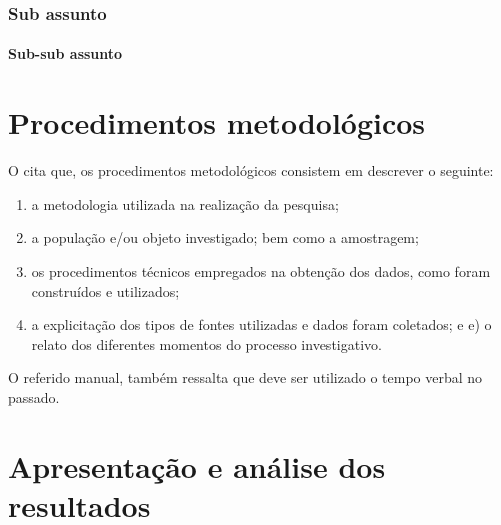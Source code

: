 \lipsum[2-3]

\subsection{Sub assunto}

\lipsum[3-4]

\subsubsection{Sub-sub assunto}

\lipsum[4-5]


\lipsum[5-6]

\chapter{Procedimentos metodológicos}

O  cita que, os procedimentos metodológicos consistem em descrever o seguinte:

\begin{enumerate}[label=\alph*)]
    \item a metodologia utilizada na realização da pesquisa;
    \item a população e/ou objeto investigado; bem como a amostragem;
    \item os procedimentos técnicos empregados na obtenção dos dados, como foram
construídos e utilizados;
    \item a explicitação dos tipos de fontes utilizadas e dados foram coletados; e e) o relato dos diferentes momentos do processo investigativo.
\end{enumerate}

O referido manual, também ressalta que deve ser utilizado o tempo verbal no passado.


\chapter{Apresentação e análise dos resultados}